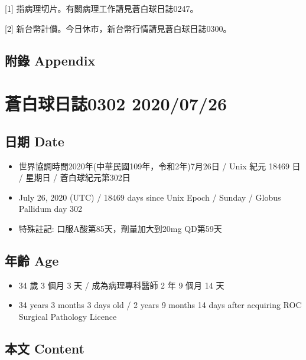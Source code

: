 \documentclass[a5paper, 11pt
]{book}
\providecommand{\tightlist}{%
  \setlength{\itemsep}{0pt}\setlength{\parskip}{0pt}}
\begin{document}
{[}1{]} 指病理切片。有關病理工作請見蒼白球日誌0247。

{[}2{]} 新台幣計價。今日休市，新台幣行情請見蒼白球日誌0300。

\hypertarget{ux9644ux9304-appendix-54}{%
\subsection{附錄 Appendix}\label{ux9644ux9304-appendix-54}}

\hypertarget{ux84bcux767dux7403ux65e5ux8a8c0302-20200726}{%
\section{蒼白球日誌0302
2020/07/26}\label{ux84bcux767dux7403ux65e5ux8a8c0302-20200726}}

\hypertarget{ux65e5ux671f-date-55}{%
\subsection{日期 Date}\label{ux65e5ux671f-date-55}}

\begin{itemize}
\tightlist
\item
  世界協調時間2020年(中華民國109年，令和2年)7月26日 / Unix 紀元 18469 日
  / 星期日 / 蒼白球紀元第302日
\item
  July 26, 2020 (UTC) / 18469 days since Unix Epoch / Sunday / Globus
  Pallidum day 302
\item
  特殊註記: 口服A酸第85天，劑量加大到20mg QD第59天
\end{itemize}

\hypertarget{ux5e74ux9f61-age-55}{%
\subsection{年齡 Age}\label{ux5e74ux9f61-age-55}}

\begin{itemize}
\tightlist
\item
  34 歲 3 個月 3 天 / 成為病理專科醫師 2 年 9 個月 14 天
\item
  34 years 3 months 3 days old / 2 years 9 months 14 days after
  acquiring ROC Surgical Pathology Licence
\end{itemize}

\hypertarget{ux672cux6587-content-55}{%
\subsection{本文 Content}\label{ux672cux6587-content-55}}
\end{document}

